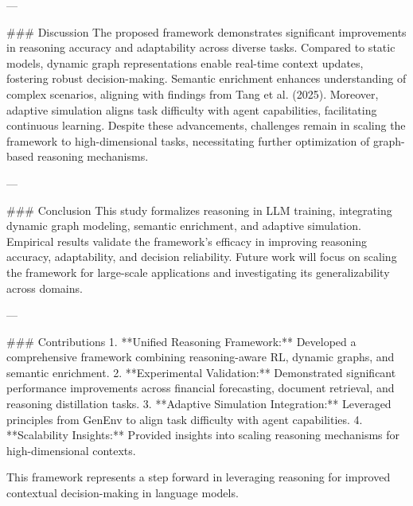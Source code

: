 ---

### Discussion  
The proposed framework demonstrates significant improvements in reasoning accuracy and adaptability across diverse tasks. Compared to static models, dynamic graph representations enable real-time context updates, fostering robust decision-making. Semantic enrichment enhances understanding of complex scenarios, aligning with findings from Tang et al. (2025). Moreover, adaptive simulation aligns task difficulty with agent capabilities, facilitating continuous learning. Despite these advancements, challenges remain in scaling the framework to high-dimensional tasks, necessitating further optimization of graph-based reasoning mechanisms.

---

### Conclusion  
This study formalizes reasoning in LLM training, integrating dynamic graph modeling, semantic enrichment, and adaptive simulation. Empirical results validate the framework's efficacy in improving reasoning accuracy, adaptability, and decision reliability. Future work will focus on scaling the framework for large-scale applications and investigating its generalizability across domains.

---

### Contributions  
1. **Unified Reasoning Framework:** Developed a comprehensive framework combining reasoning-aware RL, dynamic graphs, and semantic enrichment.  
2. **Experimental Validation:** Demonstrated significant performance improvements across financial forecasting, document retrieval, and reasoning distillation tasks.  
3. **Adaptive Simulation Integration:** Leveraged principles from GenEnv to align task difficulty with agent capabilities.  
4. **Scalability Insights:** Provided insights into scaling reasoning mechanisms for high-dimensional contexts.  

This framework represents a step forward in leveraging reasoning for improved contextual decision-making in language models.